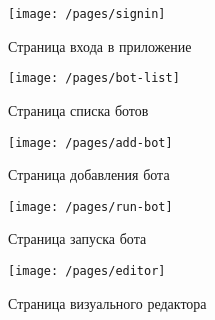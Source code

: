 {

\newcommand{\scale}{1}

\begin{figure}[p!]
	\centering
	\vspace{\toppaddingoffigure}
	\texttt{[image: /pages/signin]}
	\caption{Страница входа в приложение}
	\label{f:signin-page}
\end{figure}


\begin{figure}[p!]
	\centering
	\texttt{[image: /pages/bot-list]}
	\caption{Страница списка ботов}
	\label{f:bot-list-page}
\end{figure}

\begin{figure}[p!]
	\centering
	\texttt{[image: /pages/add-bot]}
	\caption{Страница добавления бота}
	\label{f:add-bot-page}
\end{figure}

\begin{figure}[p!]
	\centering
	\texttt{[image: /pages/run-bot]}
	\caption{Страница запуска бота}
	\label{f:run-bot-page}
\end{figure}


\begin{figure}[ht]
	\centering
	\texttt{[image: /pages/editor]}
	\caption{Страница визуального редактора}
	\label{f:editor-page}
\end{figure}

}
